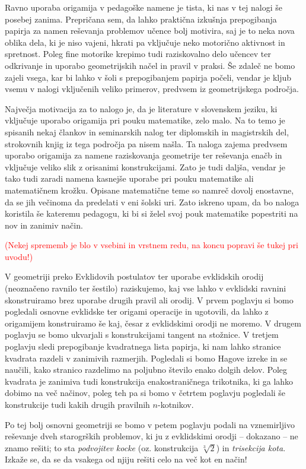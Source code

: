 Ravno uporaba origamija v pedagoške namene je tista, ki nas v tej nalogi še posebej zanima. Prepričana sem, da lahko praktična izkušnja prepogibanja papirja za namen reševanja problemov učence bolj motivira, saj je to neka nova oblika dela, ki je niso vajeni, hkrati pa vključuje neko motorično aktivnost in spretnost. Poleg fine motorike krepimo tudi raziskovalno delo učencev ter odkrivanje in uporabo geometrijskih načel in pravil v praksi. Še zdaleč ne bomo zajeli vsega, kar bi lahko v šoli s prepogibanjem papirja počeli, vendar je kljub vsemu v nalogi vključenih veliko primerov, predvsem iz geometrijskega področja.

Največja motivacija za to nalogo je, da je literature v slovenskem jeziku, ki vključuje uporabo origamija pri pouku matematike, zelo malo. Na to temo je spisanih nekaj člankov in seminarskih nalog ter diplomskih in magistrskih del, strokovnih knjig iz tega področja pa nisem našla. Ta naloga zajema predvsem uporabo origamija za namene raziskovanja geometrije ter reševanja enačb in vključuje veliko slik z orisanimi konstrukcijami. Zato je tudi daljša, vendar je tako tudi zaradi namena kasnejše uporabe pri pouku matematike ali matematičnem krožku. Opisane matematične teme so namreč dovolj enostavne, da se jih večinoma da predelati v eni šolski uri. Zato iskreno upam, da bo naloga koristila še kateremu pedagogu, ki bi si želel svoj pouk matematike popestriti na nov in zanimiv način.

\textcolor{red}{(Nekej sprememb je blo v vsebini in vrstnem redu, na koncu popravi še tukej pri uvodu!)}

V geometriji preko Evklidovih postulatov ter uporabe evklidskih orodij (neoznačeno ravnilo ter šestilo) raziskujemo, kaj vse lahko v evklidski ravnini skonstruiramo brez uporabe drugih pravil ali orodij. V prvem poglavju si bomo pogledali osnovne evklidske ter origami operacije in ugotovili, da lahko z origamijem konstruiramo še kaj, česar z evklidskimi orodji ne moremo. V drugem poglavju se bomo ukvarjali s konstrukcijami tangent na stožnice. V tretjem poglavju sledi prepogibanje kvadratnega lista papirja, ki nam lahko stranice kvadrata razdeli v zanimivih razmerjih. Pogledali si bomo Hagove izreke in se naučili, kako stranico razdelimo na poljubno število enako dolgih delov. Poleg kvadrata je zanimiva tudi konstrukcija enakostraničnega trikotnika, ki ga lahko dobimo na več načinov, poleg teh pa si bomo v četrtem poglavju pogledali še konstrukcije tudi kakih drugih pravilnih $n$-kotnikov.

Po tej bolj osnovni geometriji se bomo v petem poglavju podali na vznemirljivo reševanje dveh starogrških problemov, ki ju z evklidskimi orodji -- dokazano -- ne znamo rešiti; to sta \emph{podvojitev kocke} (oz. konstrukcija $\sqrt[3]{2}$) in \emph{trisekcija kota}. Izkaže se, da se da vsakega od njiju rešiti celo na več kot en način!

